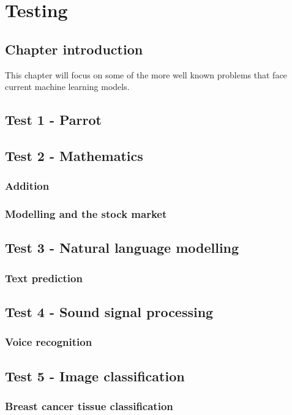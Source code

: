 \chapter{Testing}
\section{Chapter introduction}
This chapter will focus on some of the more well known problems that face current machine learning models. 
\section{Test 1 - Parrot}
\section{Test 2 - Mathematics}
\subsection{Addition}
\subsection{Modelling and the stock market}
\section{Test 3 - Natural language modelling}
\subsection{Text prediction}
\section{Test 4 - Sound signal processing}
\subsection{Voice recognition}
\section{Test 5 - Image classification}
\subsection{Breast cancer tissue classification}
